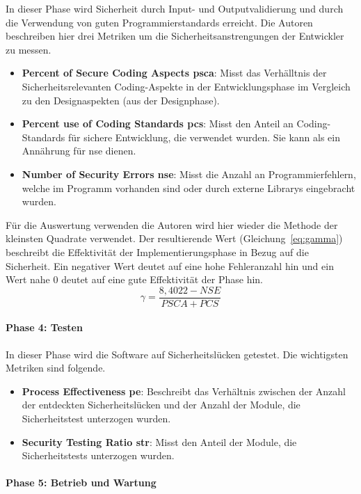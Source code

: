 \documentclass[12pt, a4paper, ngerman]{article}
\begin{document}
In dieser Phase wird Sicherheit durch Input- und Outputvalidierung und durch die Verwendung von guten Programmierstandards erreicht.
Die Autoren beschreiben hier drei Metriken um die Sicherheitsanstrengungen der Entwickler zu messen.
\begin{itemize}
  \item \textbf{Percent of Secure Coding Aspects \ac{psca}}: Misst das Verhälltnis der Sicherheitsrelevanten Coding-Aspekte in der Entwicklungsphase im Vergleich zu den Designaspekten (aus der Designphase).
  \item \textbf{Percent use of Coding Standards \ac{pcs}}: Misst den Anteil an Coding-Standards für sichere Entwicklung, die verwendet wurden. Sie kann als ein Annährung für \ac{nse} dienen.
  \item \textbf{Number of Security Errors \ac{nse}}: Misst die Anzahl an Programmierfehlern, welche im Programm vorhanden sind oder durch externe Librarys eingebracht wurden.
\end{itemize}
Für die Auswertung verwenden die Autoren wird hier wieder die Methode der kleinsten Quadrate verwendet.
Der resultierende Wert \gamma (Gleichung~\ref{eq:gamma}) beschreibt die Effektivität der Implementierungsphase in Bezug auf die Sicherheit.
Ein negativer \gamma Wert deutet auf eine hohe Fehleranzahl hin und ein Wert nahe 0 deutet auf eine gute Effektivität der Phase hin.
\begin{equation} \label{eq:gamma}
  \gamma = \frac{ 8,4022 - NSE }{ PSCA + PCS }
\end{equation}

\paragraph{Phase 4: Testen}

In dieser Phase wird die Software auf Sicherheitslücken getestet.
Die wichtigsten Metriken sind folgende.
\begin{itemize}
  \item \textbf{Process Effectiveness \ac{pe}}: Beschreibt das Verhältnis zwischen der Anzahl der entdeckten Sicherheitslücken und der Anzahl der Module, die Sicherheitstest unterzogen wurden.
  \item \textbf{Security Testing Ratio \ac{str}}: Misst den Anteil der Module, die Sicherheitstests unterzogen wurden.
\end{itemize}

\paragraph{Phase 5: Betrieb und Wartung}
\end{document}
